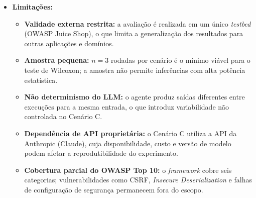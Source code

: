 \documentclass[12pt, a4paper]{article}
\begin{document}
\begin{itemize}
  \vspace{0.4em}
  \textbf{Fase 6 -- Análise Estatística e Redação}
  \begin{itemize}
    \item \textit{Objetivo:} Determinar se as diferenças de F1-\textit{Score} entre os cenários são estatisticamente significativas e documentar os resultados na forma de artigo científico.
    \item \textit{Como será conduzida:} Teste de Wilcoxon \textit{signed-rank} (não-paramétrico, adequado a amostras pequenas com $n = 3$) com $\alpha = 0{,}05$ para cada par de cenários (A$\times$C, B$\times$C). Redação do artigo no formato de conferência brasileira (SBSEG ou SBES), com seções de Introdução, Trabalhos Relacionados, \textit{Framework}, Avaliação e Conclusão.
    \item \textit{Tipo de resultado que gera:} $p$-valores e decisão sobre H1, H2 e H3; artigo científico completo submetível a conferência da área.
  \end{itemize}

  \item \textbf{Limitações:}
  \begin{itemize}
    \item \textbf{Validade externa restrita:} a avaliação é realizada em um único \textit{testbed} (OWASP Juice Shop), o que limita a generalização dos resultados para outras aplicações e domínios.
    \item \textbf{Amostra pequena:} $n = 3$ rodadas por cenário é o mínimo viável para o teste de Wilcoxon; a amostra não permite inferências com alta potência estatística.
    \item \textbf{Não determinismo do LLM:} o agente produz saídas diferentes entre execuções para a mesma entrada, o que introduz variabilidade não controlada no Cenário C.
    \item \textbf{Dependência de API proprietária:} o Cenário C utiliza a API da Anthropic (Claude), cuja disponibilidade, custo e versão de modelo podem afetar a reprodutibilidade do experimento.
    \item \textbf{Cobertura parcial do OWASP Top 10:} o \textit{framework} cobre seis categorias; vulnerabilidades como CSRF, \textit{Insecure Deserialization} e falhas de configuração de segurança permanecem fora do escopo.
  \end{itemize}


\end{itemize}
\end{document}
